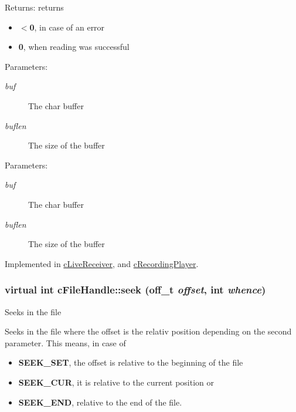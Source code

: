 \begin{Desc}
\item[Returns:]returns\begin{itemize}
\item {\bf $<$0}, in case of an error\item {\bf 0}, when reading was successful\end{itemize}
\end{Desc}
\begin{Desc}
\item[Parameters:]
\begin{description}
\item[{\em buf}]The char buffer \item[{\em buflen}]The size of the buffer \end{description}
\end{Desc}
\begin{Desc}
\item[Parameters:]
\begin{description}
\item[{\em buf}]The char buffer \item[{\em buflen}]The size of the buffer \end{description}
\end{Desc}


Implemented in \hyperlink{classcLiveReceiver_4a19e1fd4e1d043fb091bfb01a9cbf08}{cLiveReceiver}, and \hyperlink{classcRecordingPlayer_e0fda8b0be8e47133698f1763e649b3d}{cRecordingPlayer}.\hypertarget{classcFileHandle_d2dde523301abe5e79e6109a93ba705b}{
\subsubsection[{seek}]{\setlength{\rightskip}{0pt plus 5cm}virtual int cFileHandle::seek (off\_\-t {\em offset}, \/  int {\em whence})}}
\label{classcFileHandle_d2dde523301abe5e79e6109a93ba705b}


Seeks in the file

Seeks in the file where the offset is the relativ position depending on the second parameter. This means, in case of

\begin{itemize}
\item {\bf SEEK\_\-SET}, the offset is relative to the beginning of the file\item {\bf SEEK\_\-CUR}, it is relative to the current position or\item {\bf SEEK\_\-END}, relative to the end of the file.\end{itemize}


